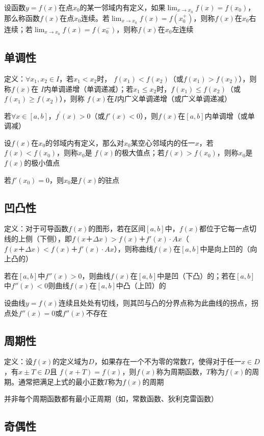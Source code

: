\documentclass[12pt]{book}
\begin{document}
设函数$y=f(x)$在点$x_0$的某一邻域内有定义，如果$\lim_{x\rightarrow x_0}{f(x)}= f(x_0)$，那么称函数$f(x)$在点$x_0$连续。若$\lim_{x\rightarrow x_0}{f(x)}= f(x_0^+)$，则称$f(x)$在$x_0$右连续；若$\lim_{x\rightarrow x_0}{f(x)}= f(x_0^-)$，则称$f(x)$在$x_0$左连续

\subsection{单调性}

定义：$\forall x_1, x_2\in I$，若$x_1<x_2$时， $f(x_1)<f(x_2)$（或$f(x_1)>f(x_2)$），则称$f(x)$在 $I$内单调递增（单调递减）；若$x_1\leq x_2$时，$f(x_1)\leq f(x_2)$（或$f(x_1)\geq f(x_2)$），则称 $f(x)$在$I$内广义单调递增（或广义单调递减）

若$\forall x\in[a,b]$，$f^\prime(x)>0$（或$f'(x)<0$），则$f(x)$在$[a,b]$内单调增（或单调减）

设$ f(x)$在$x_0$的邻域内有定义，那么对$x_0$某空心邻域内的任一$x$，若$f(x)< f(x_0)$，则称$x_0$是 $f(x)$的极大值点；若$f(x)> f(x_0)$，则称$x_0$是 $f(x)$的极小值点

若$f'(x_0)=0$，则$x_0$是$f(x)$的驻点

\subsection{凹凸性}

定义：对于可导函数$f(x)$的图形，若在区间$[a,b]$中，$f(x)$都位于它每一点切线的上侧（下侧），即$ f(x＋\Delta x)>f(x)＋f'(x)\cdot A x$（$ f(x＋\Delta x)<f(x)＋f'(x)\cdot A x$），则称曲线$f(x)$在$[a,b]$中是向上凹的（向上凸的）


若在$[a,b]$中$ f''(x)> 0$，则曲线$f(x)$在$[a,b]$中是凹（下凸）的；若在$[a,b]$中$f''(x)<0$则曲线$f(x)$在$[a,b]$中凸（上凹）的

设曲线$y=f(x)$连续且处处有切线，则其凹与凸的分界点称为此曲线的拐点，拐点处$f''(x)=0$或$f''(x)$不存在

\subsection{周期性}

定义：设$f(x)$的定义域为$D$，如果存在一个不为零的常数$T$，使得对于任一$ x \in D$，有$x\pm T\in D$且 $f(x+T)= f(x)$，则$f(x)$称为周期函数，$T$称为$f(x)$的周期。通常把满足上式的最小正数$T$称为$f(x)$的周期


并非每个周期函数都有最小正周期（如，常数函数、狄利克雷函数）

\subsection{奇偶性}
\end{document}
